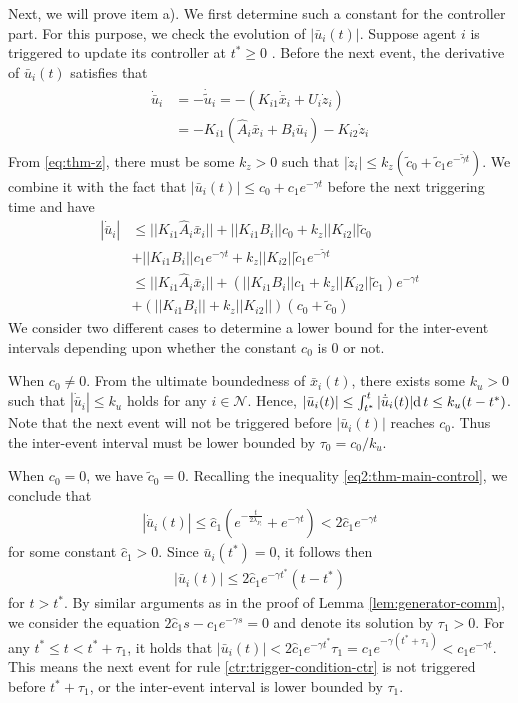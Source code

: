\documentclass[sort&compress]{IEEEtran}
\newcommand{\N}{\mathcal{N}}
\begin{document}
Next, we will prove  item a).  We first determine such a constant for the controller part. For this purpose, we check the evolution of $|\bar u_i(t)|$.  Suppose agent $i$ is triggered to update its controller at $t^*\geq 0$ .  Before the next event, the derivative of $\bar u_i(t)$ satisfies that
\begin{align}\label{eq3:thm-main-control}
	\begin{split}
		\dot{\bar u}_i &=-\dot{\tilde u}_i =-(K_{i1}\dot{\bar x}_i+ U_i\dot{z}_i)\\
		&=-K_{i1}(\hat A_i\bar x_i+B_i\bar u_i)-K_{i2} \dot{z}_i
	\end{split}
\end{align}
From \eqref{eq:thm-z}, there must be some  $k_z>0$ such that $|\dot{z}_i|\leq k_z(\tilde c_0+\tilde c_1 e^{-\tilde \gamma t})$. We combine it with the fact that $|\bar u_i(t)|\leq c_0+c_1e^{-\gamma t}$ before the next triggering time and have   
\begin{align*}
	|\dot{\bar u}_i| & \leq ||K_{i1}\hat A_i \bar x_i||+||K_{i1}B_i||c_0+k_z ||K_{i2}|| \tilde c_0\\
	& + ||K_{i1}B_i|| c_1e^{-\gamma t} + k_z||K_{i2}||\tilde c_1e^{-\tilde \gamma t}\\
	&\leq ||K_{i1}\hat A_i \bar x_i||+ (||K_{i1}B_i|| c_1+k_z||K_{i2}||\tilde c_1)e^{-\gamma t}\\
	&+(||K_{i1}B_i||+k_z ||K_{i2}||)(c_0+\tilde c_0) 
\end{align*}
We consider two different cases to determine a lower bound for the inter-event intervals depending upon whether the constant $c_0$ is $0$ or not.

When $c_0\neq 0$. From the ultimate boundedness of $\bar x_i(t)$, there exists some $k_u>0$ such that $|\dot{\bar u}_i| \leq k_u$ holds for any $i\in \N$.  Hence, $|\bar u_i(t)|\leq \int_{t^*}^t  |\dot{\bar u}_i(t)|{\rm d}\,t \leq k_u (t-t^*)$. Note that the next event will not be triggered before $|\bar u_i(t)|$ reaches $c_0$.  Thus the inter-event interval must be lower bounded by $\tau_0=c_0/k_u$. 

When $c_0=0$, we have $\tilde c_0=0$. Recalling the inequality \eqref{eq2:thm-main-control}, we conclude that
\begin{align*}
	|\dot{\bar u}_i(t)|\leq \hat c_1 (e^{-\frac{t}{2\lambda_{P_i}}}+ e^{- \gamma t}) <2\hat c_1 e^{-\gamma t} 
\end{align*}
for some constant $\hat c_1>0$. Since $\bar u_i(t^*)=0$, it follows then 
\begin{align*}
	|\bar u_i(t)|\leq  2\hat c_1 e^{-\gamma t^*}(t-t^*)
\end{align*}
for $t>t^*$. By similar arguments as in the proof of Lemma \ref{lem:generator-comm}, we consider the equation $2\hat c_1s-c_1e^{-\gamma s}=0$ and denote its solution by $\tau_1>0$. For any $t^*\leq t<t^*+\tau_1$, it holds that $|\bar u_i(t)| <2\hat c_1 e^{-\gamma t^*}\tau_1=c_1e^{-\gamma (t^*+\tau_1)}<c_1e^{-\gamma t}$. This means the next event for rule \eqref{ctr:trigger-condition-ctr} is not triggered before $t^*+\tau_1$, or the inter-event interval is lower bounded by $\tau_1$.
\end{document}
